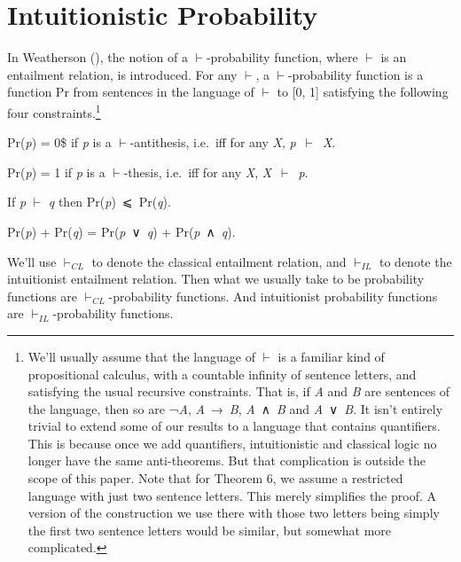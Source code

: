 \documentclass[
  11pt,
  letterpaper,
  DIV=11,
  numbers=noendperiod,
  twoside]{scrartcl}
\providecommand{\tightlist}{%
  \setlength{\itemsep}{0pt}\setlength{\parskip}{0pt}}
\begin{document}
\section{Intuitionistic Probability}\label{intuitionistic-probability}

In Weatherson (), the notion of a
\(\vdash\)-probability function, where \(\vdash\) is an entailment
relation, is introduced. For any \(\vdash\), a \(\vdash\)-probability
function is a function Pr from sentences in the language of \(\vdash\)
to {[}0, 1{]} satisfying the following four constraints.\footnote{We'll
  usually assume that the language of \(\vdash\) is a familiar kind of
  propositional calculus, with a countable infinity of sentence letters,
  and satisfying the usual recursive constraints. That is, if \emph{A}
  and \emph{B} are sentences of the language, then so are ¬\emph{A},
  \emph{A}~→~\emph{B}, \emph{A}~∧~\emph{B} and \emph{A}~∨~\emph{B}. It
  isn't entirely trivial to extend some of our results to a language
  that contains quantifiers. This is because once we add quantifiers,
  intuitionistic and classical logic no longer have the same
  anti-theorems. But that complication is outside the scope of this
  paper. Note that for Theorem 6, we assume a restricted language with
  just two sentence letters. This merely simplifies the proof. A version
  of the construction we use there with those two letters being simply
  the first two sentence letters would be similar, but somewhat more
  complicated.}

\begin{description}
\tightlist
\item[(P0)]
Pr(\emph{p}) = 0\$ if \emph{p} is a \(\vdash\)-antithesis, i.e.~iff for
any \emph{X}, \emph{p}~\(\vdash\)~\emph{X}.
\item[(P1)]
Pr(\emph{p}) = 1 if \emph{p} is a \(\vdash\)-thesis, i.e.~iff for any
\emph{X}, \emph{X}~\(\vdash\)~\emph{p}.
\item[(P2)]
If \emph{p} \(\vdash\) \emph{q} then Pr(\emph{p})~⩽~Pr(\emph{q}).
\item[(P3)]
Pr(\emph{p}) + Pr(\emph{q}) = Pr(\emph{p}~∨~\emph{q}) +
Pr(\emph{p}~∧~\emph{q}).
\end{description}

We'll use \(\vdash_{CL}\) to denote the classical entailment relation,
and \(\vdash_{IL}\) to denote the intuitionist entailment relation. Then
what we usually take to be probability functions are
\(\vdash_{CL}\)-probability functions. And intuitionist probability
functions are \(\vdash_{IL}\)-probability functions.
\end{document}

